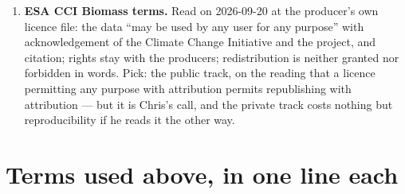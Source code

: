 \documentclass[10pt]{article}
\begin{document}
\begin{enumerate}
records is a sixth of the world's species records; dropping them is the
cheaper answer and costs coverage that is not evenly distributed.
\item \textbf{ESA CCI Biomass terms.} Read on 2026-09-20 at the producer's
own licence file: the data ``may be used by any user for any purpose'' with
acknowledgement of the Climate Change Initiative and the project, and
citation; rights stay with the producers; redistribution is neither granted
nor forbidden in words. Pick: the public track, on the reading that a
licence permitting any purpose with attribution permits republishing with
attribution --- but it is Chris's call, and the private track costs nothing
but reproducibility if he reads it the other way.
\end{enumerate}

\section*{Terms used above, in one line each}
\footnotesize
\end{document}
